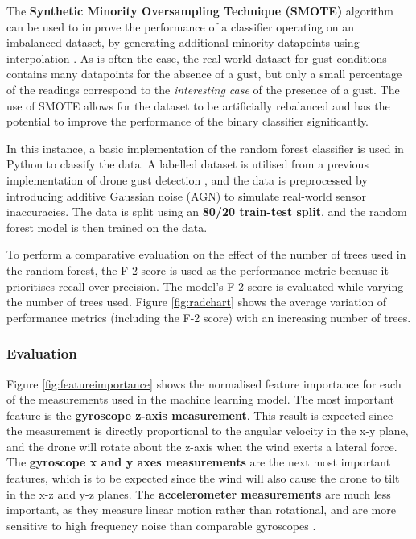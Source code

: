 The  \textbf{Synthetic Minority Oversampling Technique (SMOTE)} algorithm can be used to improve the performance of a classifier operating on an imbalanced dataset, by generating additional minority datapoints using interpolation \cite{chawla2002smote}. As is often the case, the real-world dataset for gust conditions contains many datapoints for the absence of a gust, but only a small percentage of the readings correspond to the \textit{interesting case} of the presence of a gust. The use of SMOTE allows for the dataset to be artificially rebalanced and has the potential to improve the performance of the binary classifier significantly.

In this instance, a basic implementation of the random forest classifier \cite{scikit-learn} is used in Python to classify the data. A labelled dataset is utilised from a previous implementation of drone gust detection \cite{gu2018wind}, and the data is preprocessed by introducing additive Gaussian noise (AGN) to simulate real-world sensor inaccuracies. The data is split using an \textbf{80/20 train-test split}, and the random forest model is then trained on the data. 

To perform a comparative evaluation on the effect of the number of trees used in the random forest, the F-2 score is used as the performance metric because it prioritises recall over precision. The model's F-2 score is evaluated while varying the number of trees used. Figure \ref{fig:radchart} shows the average variation of performance metrics (including the F-2 score) with an increasing number of trees. 

\subsubsection{Evaluation}

Figure \ref{fig:featureimportance} shows the normalised feature importance for each of the measurements used in the machine learning model. The most important feature is the \textbf{gyroscope z-axis measurement}. This result is expected since the measurement is directly proportional to the angular velocity in the x-y plane, and the drone will rotate about the z-axis when the wind exerts a lateral force. The \textbf{gyroscope x and y axes measurements} are the next most important features, which is to be expected since the wind will also cause the drone to tilt in the x-z and y-z planes. The \textbf{accelerometer measurements} are much less important, as they measure linear motion rather than rotational, and are more sensitive to high frequency noise than comparable gyroscopes \cite{CASSON2016175}. 

